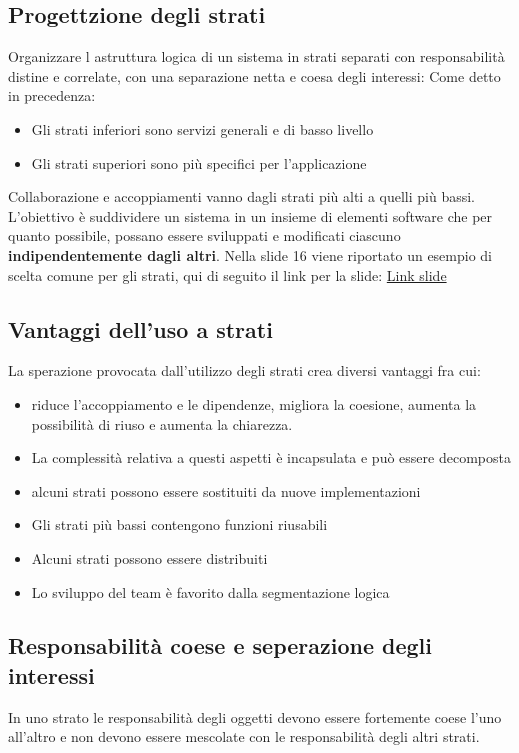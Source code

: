 \subsection{Progettzione degli strati}
Organizzare l astruttura logica di un sistema in strati separati con responsabilità
distine e correlate, con una separazione netta e coesa degli interessi:
Come detto in precedenza:
\begin{itemize}
    \item Gli strati inferiori sono servizi generali e di basso livello
    \item Gli strati superiori sono più specifici per l'applicazione
\end{itemize}
Collaborazione e accoppiamenti vanno dagli strati più alti a quelli più bassi.
L'obiettivo è suddividere un sistema in un insieme di elementi software che
per quanto possibile, possano essere sviluppati e modificati ciascuno
\textbf{indipendentemente dagli altri}.
Nella slide 16 viene riportato un esempio di scelta comune per gli strati,
qui di seguito il link per la slide: \href{https://elearning.unimib.it/pluginfile.php/1463482/mod_resource/content/2/08_Dai%20requisiti%20alla%20progettazione%20e%20architettura%20logica.pdf}{Link slide} 
\subsection*{Vantaggi dell'uso a strati}
La sperazione provocata dall'utilizzo degli strati crea diversi vantaggi fra cui:
\begin{itemize}
    \item riduce l'accoppiamento e le dipendenze, migliora la coesione, aumenta la possibilità di riuso e aumenta
    la chiarezza.
    \item La complessità relativa a questi aspetti è incapsulata e può essere
    decomposta
    \item alcuni strati possono essere sostituiti da nuove implementazioni
    \item Gli strati più bassi contengono funzioni riusabili
    \item Alcuni strati possono essere distribuiti
    \item Lo sviluppo del team è favorito dalla segmentazione logica     
\end{itemize}
\subsection*{Responsabilità coese e seperazione degli interessi}
In uno strato le responsabilità degli oggetti devono essere fortemente coese
l'uno all'altro e non devono essere mescolate con le responsabilità degli altri
strati.
